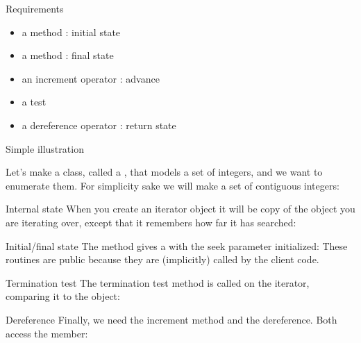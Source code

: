 \begin{slide}{Requirements}
  \label{sl:rangemethods}
  \begin{itemize}
  \item a method : initial state
  \item a method :  final state
  \item an increment operator : advance
  \item a test 
  \item a dereference operator : return state
  \end{itemize}
\end{slide}

\begin{block}{Simple illustration}
  \label{sl:bagdata}
  
  Let's make a class, called a , that models a set of integers,
  and we want to enumerate them. For simplicity sake we will make a set
  of contiguous integers:
\end{block}

\begin{block}{Internal state}
  \label{sl:bagseek}
  When you create an iterator object it will be copy of the object you
  are iterating over, except that it remembers how far it has
  searched:
\end{block}

\begin{block}{Initial/final state}
  \label{sl:bagbeginend}
  The  method gives a  with the seek parameter
  initialized:
  These routines are public because they are (implicitly) called by the
  client code.
\end{block}

\begin{block}{Termination test}
  \label{sl:bagtest}
  The termination test method is called on the iterator, comparing it to
  the  object:
\end{block}

\begin{block}{Dereference}
  \label{sl:bagderef}
  Finally, we need the increment method and the dereference. Both access
  the  member:
\end{block}

